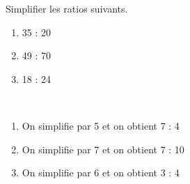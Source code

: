 \begin{exercice*}
   Simplifier les ratios suivants.
   \begin{multicols}{3}
      \begin{enumerate}
         \item 35 : 20
         \item 49 : 70
         \item 18 : 24
      \end{enumerate}
   \end{multicols}
\end{exercice*}
\begin{corrige}
   \ \\ [-5mm]
   \begin{enumerate}
      \item On simplifie par 5 et on obtient {\color{red} 7 : 4}
      \item On simplifie par 7 et on obtient {\color{red} 7 : 10}
      \item On simplifie par 6 et on obtient {\color{red} 3 : 4}
   \end{enumerate}
\end{corrige}
